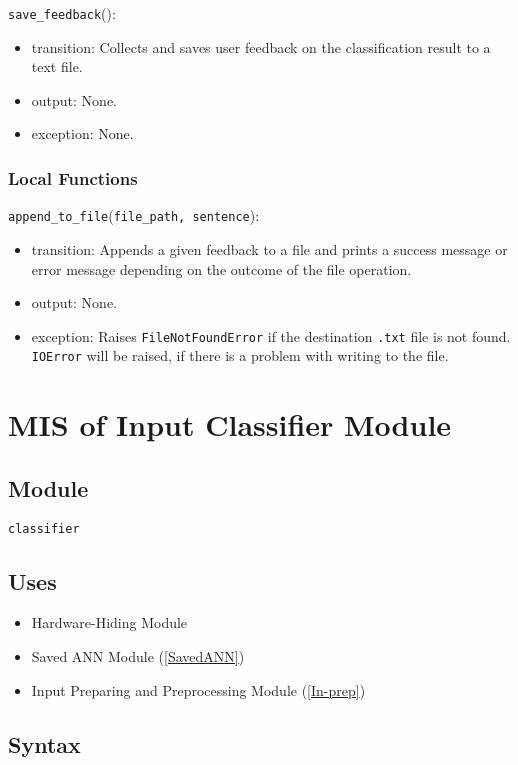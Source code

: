 \documentclass[12pt, titlepage]{article}
\def\code#1{\texttt{#1}}
\begin{document}
\noindent \code{save\_feedback}():
\begin{itemize}
  \item transition: Collects and saves user feedback on the classification result to a text file.
  \item output: None.
  \item exception: None.
\end{itemize}


\subsubsection{Local Functions}
\noindent \code{append\_to\_file}(\code{file\_path, sentence}):
\begin{itemize}
  \item transition: Appends a given feedback to a file and prints a success message or error message depending on 
  the outcome of the file operation.
  \item output: None.
  \item exception: Raises \code{FileNotFoundError} if the destination \code{.txt} file is not found. 
  \code{IOError} will be raised, if there is a problem with writing to the file. 
\end{itemize}

\newpage

\section{MIS of Input Classifier Module} \label{In-class} 

\subsection{Module}
\code{classifier} 

\subsection{Uses}
\begin{itemize}
  \item Hardware-Hiding Module  
  \item Saved ANN Module (\ref{SavedANN})
  \item Input Preparing and Preprocessing Module (\ref{In-prep})
\end{itemize}


\subsection{Syntax}
\end{document}
